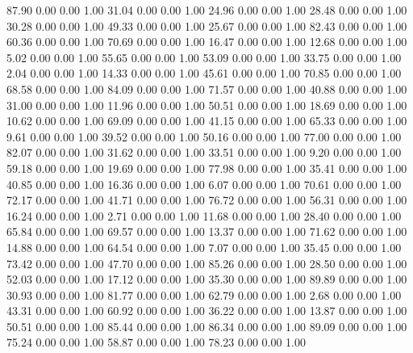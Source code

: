    87.90   0.00   0.00   1.00
   31.04   0.00   0.00   1.00
   24.96   0.00   0.00   1.00
   28.48   0.00   0.00   1.00
   30.28   0.00   0.00   1.00
   49.33   0.00   0.00   1.00
   25.67   0.00   0.00   1.00
   82.43   0.00   0.00   1.00
   60.36   0.00   0.00   1.00
   70.69   0.00   0.00   1.00
   16.47   0.00   0.00   1.00
   12.68   0.00   0.00   1.00
    5.02   0.00   0.00   1.00
   55.65   0.00   0.00   1.00
   53.09   0.00   0.00   1.00
   33.75   0.00   0.00   1.00
    2.04   0.00   0.00   1.00
   14.33   0.00   0.00   1.00
   45.61   0.00   0.00   1.00
   70.85   0.00   0.00   1.00
   68.58   0.00   0.00   1.00
   84.09   0.00   0.00   1.00
   71.57   0.00   0.00   1.00
   40.88   0.00   0.00   1.00
   31.00   0.00   0.00   1.00
   11.96   0.00   0.00   1.00
   50.51   0.00   0.00   1.00
   18.69   0.00   0.00   1.00
   10.62   0.00   0.00   1.00
   69.09   0.00   0.00   1.00
   41.15   0.00   0.00   1.00
   65.33   0.00   0.00   1.00
    9.61   0.00   0.00   1.00
   39.52   0.00   0.00   1.00
   50.16   0.00   0.00   1.00
   77.00   0.00   0.00   1.00
   82.07   0.00   0.00   1.00
   31.62   0.00   0.00   1.00
   33.51   0.00   0.00   1.00
    9.20   0.00   0.00   1.00
   59.18   0.00   0.00   1.00
   19.69   0.00   0.00   1.00
   77.98   0.00   0.00   1.00
   35.41   0.00   0.00   1.00
   40.85   0.00   0.00   1.00
   16.36   0.00   0.00   1.00
    6.07   0.00   0.00   1.00
   70.61   0.00   0.00   1.00
   72.17   0.00   0.00   1.00
   41.71   0.00   0.00   1.00
   76.72   0.00   0.00   1.00
   56.31   0.00   0.00   1.00
   16.24   0.00   0.00   1.00
    2.71   0.00   0.00   1.00
   11.68   0.00   0.00   1.00
   28.40   0.00   0.00   1.00
   65.84   0.00   0.00   1.00
   69.57   0.00   0.00   1.00
   13.37   0.00   0.00   1.00
   71.62   0.00   0.00   1.00
   14.88   0.00   0.00   1.00
   64.54   0.00   0.00   1.00
    7.07   0.00   0.00   1.00
   35.45   0.00   0.00   1.00
   73.42   0.00   0.00   1.00
   47.70   0.00   0.00   1.00
   85.26   0.00   0.00   1.00
   28.50   0.00   0.00   1.00
   52.03   0.00   0.00   1.00
   17.12   0.00   0.00   1.00
   35.30   0.00   0.00   1.00
   89.89   0.00   0.00   1.00
   30.93   0.00   0.00   1.00
   81.77   0.00   0.00   1.00
   62.79   0.00   0.00   1.00
    2.68   0.00   0.00   1.00
   43.31   0.00   0.00   1.00
   60.92   0.00   0.00   1.00
   36.22   0.00   0.00   1.00
   13.87   0.00   0.00   1.00
   50.51   0.00   0.00   1.00
   85.44   0.00   0.00   1.00
   86.34   0.00   0.00   1.00
   89.09   0.00   0.00   1.00
   75.24   0.00   0.00   1.00
   58.87   0.00   0.00   1.00
   78.23   0.00   0.00   1.00
